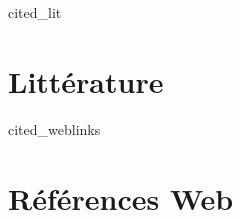\thispagestyle{empty}


\begin{btSect}[plain]{cited_lit}
\section*{Littérature}
\setlength{\bibhang}{2em}
\btPrintCited
\end{btSect}

\nocite{*} 
\begin{btSect}[plain]{cited_weblinks}
\section*{Références Web}
\setlength{\bibhang}{2em}
\btPrintCited
\end{btSect}
